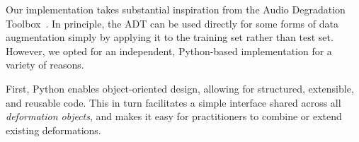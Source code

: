 \documentclass{article}
\begin{document}
%
%
Our implementation takes substantial inspiration from the Audio Degradation
Toolbox~\cite{mauch2013audio}.  In principle, the ADT can be used directly
for some forms of data augmentation simply by applying it to the training set 
rather than test set.
However, we opted for an independent, Python-based implementation for a variety of reasons.

%
First, Python enables object-oriented design, allowing for structured,
extensible, and reusable code.  This in turn facilitates a simple interface shared across
all \emph{deformation objects}, and makes it easy for practitioners to combine or extend
existing deformations.

%
\end{document}
